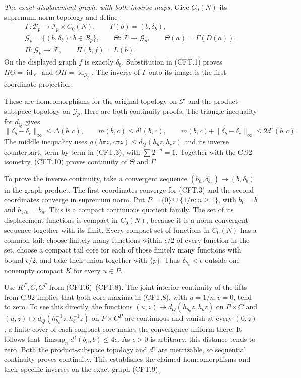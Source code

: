 \documentclass[11pt,a4paper]{article}
\DeclareMathOperator{\id}{id}\DeclareMathOperator{\im}{im}
\begin{document}
\emph{The exact displacement graph, with both inverse maps.}
Give $C_0(N)$ its supremum-norm topology and define
\[
\begin{gathered}
 \Gamma:\mathscr B_p\longrightarrow\mathscr I_p\times C_0(N),
                  \qquad \Gamma(b)=(b,\delta_b),\\
 \mathscr G_p=\{(b,\delta_b):b\in\mathscr B_p\},\qquad
 \Theta:\mathscr F\longrightarrow\mathscr G_p,
                  \qquad \Theta(a)=\Gamma(D(a)),\\
 \Pi:\mathscr G_p\longrightarrow\mathscr F,
                  \qquad \Pi(b,f)=L(b).
\end{gathered}                                                  \tag{CFT.9}
\]
On the displayed graph $f$ is exactly $\delta_b$. Substitution
in (CFT.1) proves $\Pi\Theta=\id_{\mathscr F}$ and
$\Theta\Pi=\id_{\mathscr G_p}$. The inverse of $\Gamma$ onto
its image is the first-coordinate projection.

These are homeomorphisms for the original topology on
$\mathscr F$ and the product-subspace topology on $\mathscr G_p$.
Here are both continuity proofs. The triangle inequality for
$d_Q$ gives
\[
 \|\delta_b-\delta_c\|_\infty\leq\Delta(b,c),\qquad
 m(b,c)\leq d^\uparrow(b,c),\qquad
 m(b,c)+\|\delta_b-\delta_c\|_\infty
                       \leq2d^\uparrow(b,c).
                                                               \tag{CFT.10}
\]
The middle inequality uses
$\rho(b\pi z,c\pi z)\leq d_Q(h_bz,h_cz)$ and its inverse
counterpart, term by term in (CFT.3), with $\sum2^{-n}=1$.
Together with the C.92 isometry, (CFT.10) proves continuity
of $\Theta$ and $\Gamma$.

To prove the inverse continuity, take a convergent sequence
$(b_n,\delta_{b_n})\to(b,\delta_b)$ in the graph product.
The first coordinates converge for (CFT.3) and the second
coordinates converge in supremum norm. Put
$P=\{0\}\cup\{1/n:n\geq1\}$, with $b_0=b$ and
$b_{1/n}=b_n$. This is a compact continuous quotient family.
The set of its displacement functions is compact in $C_0(N)$,
because it is a norm-convergent sequence together with its limit.
Every compact set of functions in $C_0(N)$ has a common tail:
choose finitely many functions within $\epsilon/2$ of every
function in the set, choose a compact tail core for each of
those finitely many functions with bound $\epsilon/2$, and
take their union together with $\{p\}$. Thus
$\delta_{b_u}<\epsilon$ outside one nonempty compact $K$
for every $u\in P$.

Use $K^P,C,C^P$ from (CFT.6)--(CFT.8).
The joint interior continuity of the lifts from C.92 implies
that both core maxima in (CFT.8), with $u=1/n,v=0$, tend to
zero. To see this directly, the functions
$(u,z)\mapsto d_Q(h_{b_u}z,h_bz)$ on $P\times C$ and
$(u,z)\mapsto d_Q(h_{b_u}^{-1}z,h_b^{-1}z)$ on $P\times C^P$
are continuous and vanish at every $(0,z)$; a finite cover
of each compact core makes the convergence uniform there.
It follows that
$\limsup_n d^\uparrow(b_n,b)\leq4\epsilon$.
As $\epsilon>0$ is arbitrary, this distance tends to zero.
Both the product-subspace topology and $d^\uparrow$ are
metrizable, so sequential continuity proves continuity.
This establishes the claimed homeomorphisms and their
specific inverses on the exact graph (CFT.9).
\end{document}
